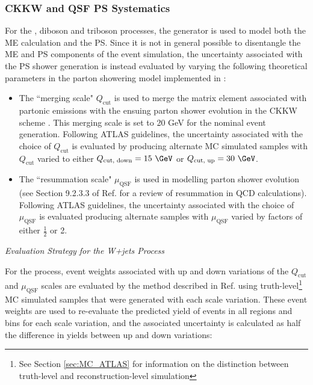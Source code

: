 \subsubsection{CKKW and QSF PS Systematics}

For the \wjets, diboson and triboson processes, the  generator is used to model both the ME calculation and the PS. Since it is not in general possible to disentangle the ME and PS components of the  event simulation, the uncertainty associated with the PS shower generation is instead evaluated by varying the following theoretical parameters in the parton showering model implemented in :

\begin{itemize}
\item The ``merging scale" \(Q_\text{cut}\) is used to merge the matrix element associated with partonic emissions with the ensuing parton shower evolution in the CKKW scheme \cite{CKKW_2009,Sherpa1.1_2009}. This merging scale is set to 20 GeV for the nominal event generation. Following ATLAS guidelines, the uncertainty associated with the choice of \(Q_\text{cut}\) is evaluated by producing alternate MC simulated samples with \(Q_\text{cut}\) varied to either \(Q_\text{cut, down}=15~\GeV\) or \(Q_\text{cut, up}=30~\GeV\). 
\item The ``resummation scale" \(\mu_\text{QSF}\) is used in modelling parton shower evolution (see Section 9.2.3.3 of Ref. \cite{pdg_2020} for a review of resummation in QCD calculations). Following ATLAS guidelines, the uncertainty associated with the choice of \(\mu_\text{QSF}\) is evaluated producing alternate samples with \(\mu_\text{QSF}\) varied by factors of either \(\frac{1}{2}\) or 2.
\end{itemize}

\vspace{1em}
\noindent\textit{Evaluation Strategy for the W+jets Process}
\vspace{1em}

For the \wjets process, event weights associated with up and down variations of the \(Q_\text{cut}\) and \(\mu_\text{QSF}\) scales are evaluated by the method described in Ref. \cite{Vjets_ckkw_qsf} using truth-level\footnote{See Section \ref{sec:MC_ATLAS} for information on the distinction between truth-level and reconstruction-level simulation} MC simulated samples that were generated with each scale variation. These event weights are used to re-evaluate the predicted yield of \wjets events in all regions and bins for each scale variation, and the associated uncertainty is calculated as half the difference in yields between up and down variations:

